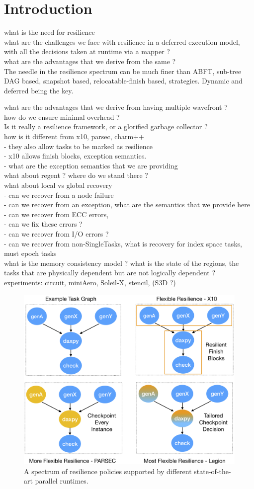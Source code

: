 \section{Introduction}

what is the need for resilience\\

what are the challenges we face with resilience in a deferred execution model, with all the decisions taken at runtime via a mapper ? \\

what are the advantages that we derive from the same ?\\
The needle in the resilience spectrum can be much finer than ABFT, sub-tree DAG based, snapshot based, relocatable-finish based, strategies. Dynamic and deferred being the key.

what are the advantages that we derive from having multiple wavefront ?\\
how do we ensure minimal overhead ?\\

Is it really a resilience framework, or a glorified garbage collector ?\\


how is it different from x10, parsec, charm++\\
	- they also allow tasks to be marked as resilience\\
	- x10 allows finish blocks, exception semantics.\\
	- what are the exception semantics that we are providing\\


what about regent ? where do we stand there ?\\

what about local vs global recovery\\
	- can we recover from a node failure\\
	- can we recover from an exception, what are the semantics that we provide here\\
	- can we recover from ECC errors, \\
	- can we fix these errors ?\\
	- can we recover from I/O errors ?\\ 
	- can we recover from non-SingleTasks, what is recovery for index space tasks, must epoch tasks\\

what is the memory consistency model ? what is the state of the regions, the tasks that are physically dependent but are not logically dependent ?\\
	

experiments: circuit, miniAero, Soleil-X, stencil, (S3D ?)\\

\begin{figure}
\includegraphics[width=.45\textwidth]{images/spectrum_x10_parsec_legion_policies.png}
\caption{A spectrum of resilience policies supported by different state-of-the-art parallel runtimes.}
\end{figure}
